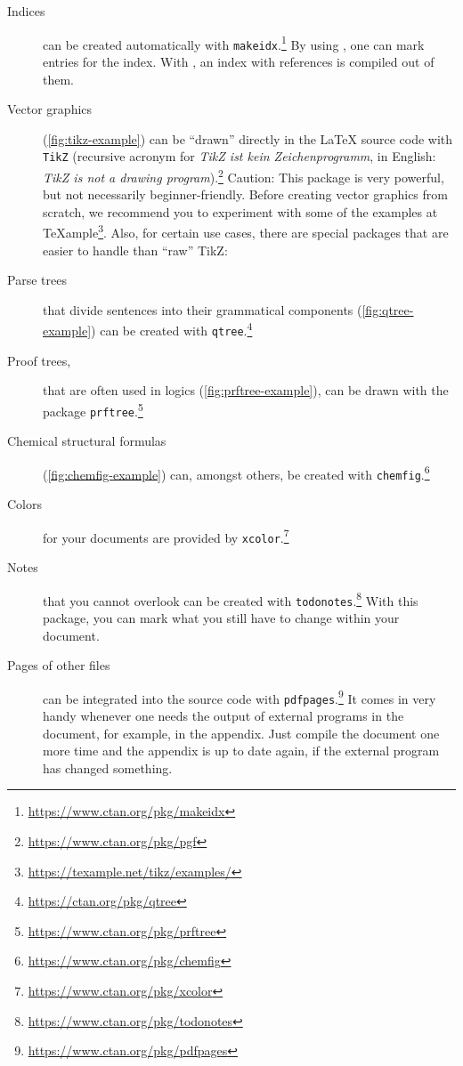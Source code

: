 \begin{description}
	\item[Indices]
		can be created automatically with \texttt{makeidx}.\footnote{\url{https://www.ctan.org/pkg/makeidx}}
		By using \texttt{}, one can mark entries for the index. With \texttt{\printindex}, an index with references is compiled out of them.
	\item[Vector graphics]
		(\cref{fig:tikz-example})
				can be \enquote{drawn} directly in the \LaTeX{} source code with \texttt{TikZ} (recursive acronym for \emph{TikZ ist kein Zeichenprogramm}, in English: \emph{TikZ is not a drawing program}).\footnote{\url{https://www.ctan.org/pkg/pgf}}
		Caution: This package is very powerful, but not necessarily beginner-friendly.
		Before creating vector graphics from scratch, we recommend you to experiment with some of the examples at \TeX{}ample\footnote{\url{https://texample.net/tikz/examples/}}. 
		Also, for certain use cases, there are special packages that are easier to handle than \enquote{raw} TikZ:
	\item[Parse trees]
		that divide sentences into their grammatical components (\cref{fig:qtree-example}) can be created with \texttt{qtree}.\footnote{\url{https://ctan.org/pkg/qtree}}
	\item[Proof trees,]
		that are often used in logics (\cref{fig:prftree-example}), can be drawn with the package \texttt{prftree}.\footnote{\url{https://www.ctan.org/pkg/prftree}}
	\item[Chemical structural formulas]
		(\cref{fig:chemfig-example})
		can, amongst others, be created with  \texttt{chemfig}.\footnote{\url{https://www.ctan.org/pkg/chemfig}}
	\item[Colors]
		for your documents are provided by \texttt{xcolor}.\footnote{\url{https://www.ctan.org/pkg/xcolor}}
	\item[Notes]
		that you cannot overlook can be created with \texttt{todonotes}.\footnote{\url{https://www.ctan.org/pkg/todonotes}}
		With this package, you can mark what you still  have to change within your document.
	\item[Pages of other  files]
		can be integrated into the source code with \texttt{pdfpages}.\footnote{\url{https://www.ctan.org/pkg/pdfpages}}
		It comes in very handy whenever one needs the output of external programs in the document, for example, in the appendix.
		Just compile the document one more time and the appendix is up to date again, if the external program has changed something.

\end{description}
